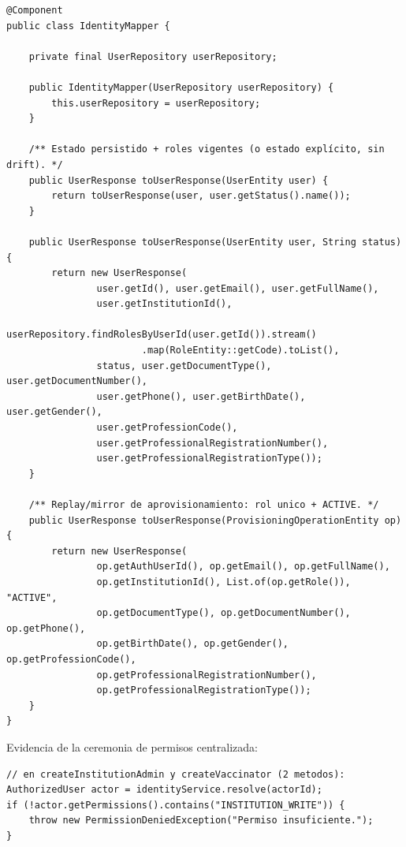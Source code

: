 \documentclass[11pt,a4paper]{article}
\begin{document}
\begin{lstlisting}[caption={IdentityMapper.java (después) --- una sola fuente de mapeo (fragmento real)}]
@Component
public class IdentityMapper {

    private final UserRepository userRepository;

    public IdentityMapper(UserRepository userRepository) {
        this.userRepository = userRepository;
    }

    /** Estado persistido + roles vigentes (o estado explícito, sin drift). */
    public UserResponse toUserResponse(UserEntity user) {
        return toUserResponse(user, user.getStatus().name());
    }

    public UserResponse toUserResponse(UserEntity user, String status) {
        return new UserResponse(
                user.getId(), user.getEmail(), user.getFullName(),
                user.getInstitutionId(),
                userRepository.findRolesByUserId(user.getId()).stream()
                        .map(RoleEntity::getCode).toList(),
                status, user.getDocumentType(), user.getDocumentNumber(),
                user.getPhone(), user.getBirthDate(), user.getGender(),
                user.getProfessionCode(),
                user.getProfessionalRegistrationNumber(),
                user.getProfessionalRegistrationType());
    }

    /** Replay/mirror de aprovisionamiento: rol unico + ACTIVE. */
    public UserResponse toUserResponse(ProvisioningOperationEntity op) {
        return new UserResponse(
                op.getAuthUserId(), op.getEmail(), op.getFullName(),
                op.getInstitutionId(), List.of(op.getRole()), "ACTIVE",
                op.getDocumentType(), op.getDocumentNumber(), op.getPhone(),
                op.getBirthDate(), op.getGender(), op.getProfessionCode(),
                op.getProfessionalRegistrationNumber(),
                op.getProfessionalRegistrationType());
    }
}
\end{lstlisting}

Evidencia de la ceremonia de permisos centralizada:

\begin{lstlisting}[caption={UserProvisioningService (antes) --- ceremonia manual repetida}]
// en createInstitutionAdmin y createVaccinator (2 metodos):
AuthorizedUser actor = identityService.resolve(actorId);
if (!actor.getPermissions().contains("INSTITUTION_WRITE")) {
    throw new PermissionDeniedException("Permiso insuficiente.");
}
\end{lstlisting}
\end{document}

